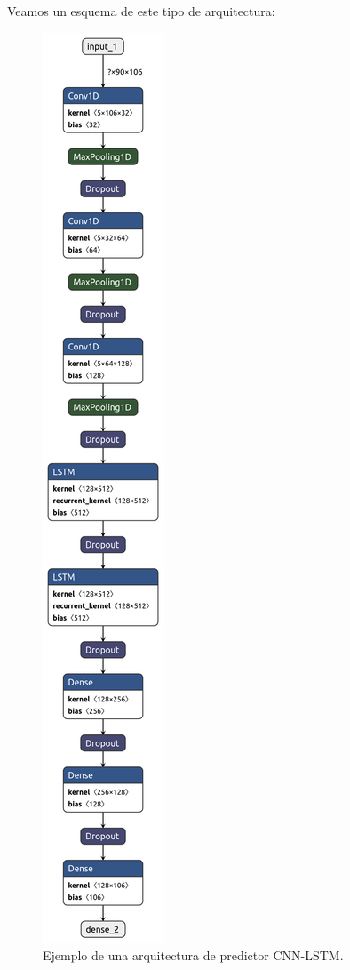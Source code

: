 Veamos un esquema de este tipo de arquitectura:

\begin{figure}[H]
	\centering
	\includegraphics[scale=0.28]{imagenes/cnn-lstm-forecaster.png}
	\caption{Ejemplo de una arquitectura de predictor CNN-LSTM.}
	\label{img:cnn-lstm-forecaster}
\end{figure}

